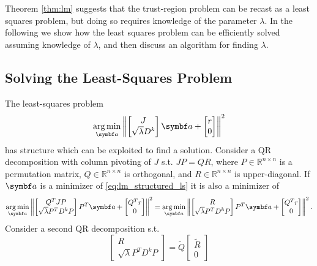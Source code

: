 Theorem \ref{thm:lm} suggests that the trust-region problem can be recast as a least squares problem, but doing so requires knowledge of the parameter $\lambda$. In the following we show how the least squares problem can be efficiently solved assuming knowledge of $\lambda$, and then discuss an algorithm for finding $\lambda$.


\subsection{Solving the Least-Squares Problem}
\label{ssec:lm_lsq}

The least-squares problem
\begin{equation}
  \label{eq:lm_structured_ls}
  \argmin_{\a} \left\| \begin{bmatrix} J \\ \sqrt{\lambda} D^k \end{bmatrix} \a + \begin{bmatrix} r \\ 0 \end{bmatrix} \right\|^2
\end{equation}
has structure which can be exploited to find a solution. Consider a QR decomposition with column pivoting of $J$ s.t. $J P = Q R$, where $P \in \mathbb{R}^{n \times n}$ is a permutation matrix, $Q \in \mathbb{R}^{n \times n}$ is orthogonal, and $R \in \mathbb{R}^{n \times n}$ is upper-diagonal. If $\a$ is a minimizer of \eqref{eq:lm_structured_ls} it is also a minimizer of
\begin{equation}
  \argmin_{\a} \left\| \begin{bmatrix} Q^{T} J P \\ \sqrt{\lambda} P^{T} D^k P \end{bmatrix} P^{T} \a + \begin{bmatrix} Q^{T} r \\ 0 \end{bmatrix} \right\|^2 =     \argmin_{\a} \left\| \begin{bmatrix} R \\ \sqrt{\lambda} P^{T} D^k P \end{bmatrix} P^{T} \a + \begin{bmatrix} Q^{T} r \\ 0 \end{bmatrix} \right\|^2.
\end{equation}
Consider a second QR decomposition s.t.
\begin{equation}
  \label{eq:lm_qr}
  \begin{bmatrix}
    R \\ \sqrt{\lambda} P^{T} D^{k} P
  \end{bmatrix} = \tilde Q \begin{bmatrix} \tilde R \\ 0 \end{bmatrix}
\end{equation}
